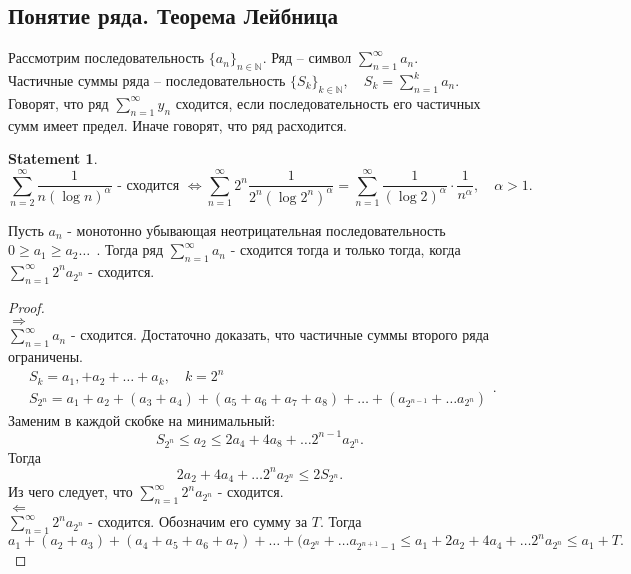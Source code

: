 \documentclass[11pt]{book}
\newcommand{\N}{\mathbb{N}}
\newcommand{\slim}{\sum\limits}
\renewcommand{\le}{\leqslant}
\renewcommand{\ge}{\geqslant}
\theoremstyle{definition}
\theoremstyle{plain}
\theoremstyle{plain}
\newtheorem*{st}{Statement}
\theoremstyle{definition}
\theoremstyle{remark}
\begin{document}
\subsection{Понятие ряда. Теорема Лейбница}\label{ques_26}
\begin{defn}
    Рассмотрим последовательность $\{a_n\}_{n \in  \N}$. Ряд -- символ $\slim_{n=1}^{\infty}a_n$.\\
    Частичные суммы ряда -- последовательность $\{S_k\}_{k \in \N}, \quad S_k = \slim_{n = 1}^k a_n$.\\
    Говорят, что ряд $\slim_{n = 1}^\infty{y_n}$ сходится, если последовательность его частичных сумм имеет предел. Иначе  говорят, что ряд расходится.
\end{defn}
\begin{st}
    \[
	\slim_{n=2}^\infty \frac{1}{n(\log n)^\alpha } \mbox{ - сходится } \Longleftrightarrow \slim_{n=1}^\infty 2^n \frac{1}{2^n (\log 2^n )^\alpha } = \slim_{n=1}^\infty \frac{1}{(\log 2)^\alpha }\cdot \frac{1}{n^\alpha }, \quad \alpha  > 1
    .\] 
\end{st}
\begin{thm}[Лейбниц]
    Пусть $a_n$ - монотонно убывающая неотрицательная последовательность $0 \ge  a_1 \ge a_2 \ldots ~~$. Тогда ряд $\slim_{n=1}^{\infty} a_n$ - сходится тогда и только тогда, 
    когда 
    $\slim_{n=1}^{\infty} {2^n a_{2^n}}$ - сходится.
\end{thm}
\begin{proof}
	$ $ \\$ \Rightarrow  $\\
	    $\slim_{n=1}^\infty a_n $ - сходится. Достаточно доказать, что частичные суммы второго ряда ограничены.\[
		\begin{array}{l}
	    S_k = a_1, + a_2 + \ldots +a_k, \quad k = 2^n\\
	    S_{2^n} = a_1 + a_2 + (a_3+a_4) + (a_5+a_6+a_7+a_8) + \ldots +(a_{2^{n-1}} + \ldots a_{2^n} ) 
		\end{array}
	    .\] 
	    Заменим в каждой скобке на минимальный:
	    \[
		S_{2^n} \le a_2 \le 2 a_4 + 4 a_8 + \ldots 2^{n-1} a_{2^n}
	    .\] 
	    Тогда  \[
		2 a_2 + 4 a_4 + \ldots 2^n a_{2^n} \le 2 S_{2^n}
	    .\] 
	    Из чего следует, что $\slim_{n=1}^{\infty} {2^n a_{2^n}}$ - сходится.
	\\$ \Leftarrow $\\
	$\slim_{n=1}^{\infty} {2^n a_{2^n}}$ - сходится. Обозначим его сумму за $T$. Тогда 
	\[
	    a_1+(a_2+a_3) + (a_4+a_5+a_6+a_7) + \ldots +(a_{2^n} + \ldots a_{2^{n+1} -1} \le a_1 + 2 a_2 +4 a_4 + \ldots 2^n a_{2^n} \le a_1 +T
	.\] 
\end{proof}
\end{document}
